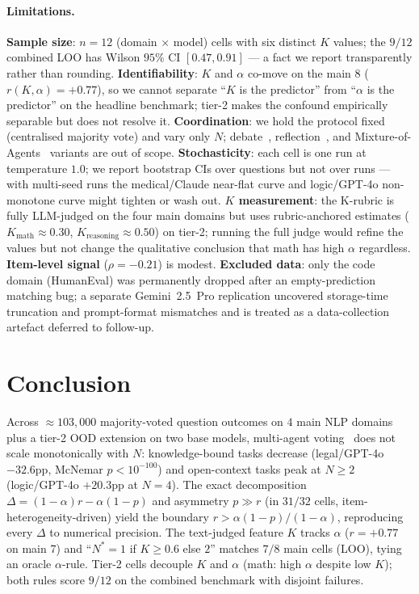 \documentclass{article}
\begin{document}
\paragraph{Limitations.} \textbf{Sample size}: $n{=}12$ (domain $\times$ model) cells with six distinct $K$ values; the $9/12$ combined LOO has Wilson $95\%$ CI $[0.47, 0.91]$ --- a fact we report transparently rather than rounding. \textbf{Identifiability}: $K$ and $\alpha$ co-move on the main $8$ ($r(K,\alpha){=}{+}0.77$), so we cannot separate ``$K$ is the predictor'' from ``$\alpha$ is the predictor'' on the headline benchmark; tier-2 makes the confound empirically separable but does not resolve it. \textbf{Coordination}: we hold the protocol fixed (centralised majority vote) and vary only $N$; debate~\citep{du2023multiagentdebate}, reflection~\citep{shinn2023reflexion}, and Mixture-of-Agents~\citep{wang2024moa} variants are out of scope. \textbf{Stochasticity}: each cell is one run at temperature $1.0$; we report bootstrap CIs over questions but not over runs --- with multi-seed runs the medical/Claude near-flat curve and logic/GPT-4o non-monotone curve might tighten or wash out. \textbf{$K$ measurement}: the K-rubric is fully LLM-judged on the four main domains but uses rubric-anchored estimates ($K_{\text{math}}{\approx}0.30$, $K_{\text{reasoning}}{\approx}0.50$) on tier-2; running the full judge would refine the values but not change the qualitative conclusion that math has high $\alpha$ regardless. \textbf{Item-level signal} ($\rho{=}{-}0.21$) is modest. \textbf{Excluded data}: only the code domain (HumanEval) was permanently dropped after an empty-prediction matching bug; a separate Gemini~2.5~Pro replication uncovered storage-time truncation and prompt-format mismatches and is treated as a data-collection artefact deferred to follow-up.


\section{Conclusion}
\label{sec:conclusion}

Across ${\approx}103{,}000$ majority-voted question outcomes on $4$ main NLP domains plus a tier-2 OOD extension on two base models, multi-agent voting~\citep{li2024moreagents,wang2023selfconsistency} does not scale monotonically with $N$: knowledge-bound tasks decrease (legal/GPT-4o $-32.6$pp, McNemar $p{<}10^{-100}$) and open-context tasks peak at $N{\geq}2$ (logic/GPT-4o $+20.3$pp at $N{=}4$). The exact decomposition $\Delta=(1{-}\alpha)r-\alpha(1{-}p)$ and asymmetry $p \gg r$ (in $31/32$ cells, item-heterogeneity-driven) yield the boundary $r > \alpha(1{-}p)/(1{-}\alpha)$, reproducing every $\Delta$ to numerical precision. The text-judged feature $K$ tracks $\alpha$ ($r{=}{+}0.77$ on main 7) and ``$N^{*}{=}1$ if $K{\geq}0.6$ else $2$'' matches $7/8$ main cells (LOO), tying an oracle $\alpha$-rule. Tier-2 cells decouple $K$ and $\alpha$ (math: high $\alpha$ despite low $K$); both rules score $9/12$ on the combined benchmark with disjoint failures.
\end{document}
